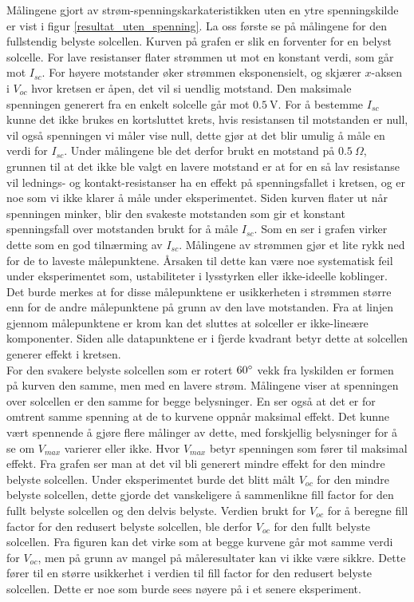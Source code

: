 \documentclass[%
 reprint,
 amsmath,amssymb,
 aps,
 norsk,
 booktabs
]{revtex4-1}
\begin{document}
Målingene gjort av strøm-spenningskarkateristikken uten en ytre spenningskilde er vist i figur \vref{resultat_uten_spenning}. La oss første se på målingene for den fullstendig belyste solcellen. Kurven på grafen er slik en forventer for en belyst solcelle. For lave resistanser flater strømmen ut mot en konstant verdi, som går mot $I_{sc}$. For høyere motstander øker strømmen eksponensielt, og skjærer $x$-aksen i $V_{oc}$ hvor kretsen er åpen, det vil si uendlig motstand. Den maksimale spenningen generert fra en enkelt solcelle går mot $\SI{0.5}{\volt}$. For å bestemme $I_{sc}$ kunne det ikke brukes en kortsluttet krets, hvis resistansen til motstanden er null, vil også spenningen vi måler vise null, dette gjør at det blir umulig å måle en verdi for $I_{sc}$. Under målingene ble det derfor brukt en motstand på $\SI{0.5}{\Omega}$, grunnen til at det ikke ble valgt en lavere motstand er at for en så lav resistanse vil lednings- og kontakt-resistanser ha en effekt på spenningsfallet i kretsen, og er noe som vi ikke klarer å måle under eksperimentet. Siden kurven flater ut når spenningen minker, blir den svakeste motstanden som gir et konstant spenningsfall over motstanden brukt for å måle $I_{sc}$. Som en ser i grafen virker dette som en god tilnærming av $I_{sc}$. Målingene av strømmen gjør et lite rykk ned for de to laveste målepunktene. Årsaken til dette kan være noe systematisk feil under eksperimentet som, ustabiliteter i lysstyrken eller ikke-ideelle koblinger. Det burde merkes at for disse målepunktene er usikkerheten i strømmen større enn for de andre målepunktene på grunn av den lave motstanden. Fra at linjen gjennom målepunktene er krom kan det sluttes at solceller er ikke-lineære komponenter. Siden alle datapunktene er i fjerde kvadrant betyr dette at solcellen generer effekt i kretsen. \\
For den svakere belyste solcellen som er rotert $60\degree$ vekk fra lyskilden er formen på kurven den samme, men med en lavere strøm. Målingene viser at spenningen over solcellen er den samme for begge belysninger. En ser også at det er for omtrent samme spenning at de to kurvene oppnår maksimal effekt. Det kunne vært spennende å gjøre flere målinger av dette, med forskjellig belysninger for å se om $V_{max}$ varierer eller ikke. Hvor $V_{max}$ betyr spenningen som fører til maksimal effekt. Fra grafen ser man at det vil bli generert mindre effekt for den mindre belyste solcellen. Under eksperimentet burde det blitt målt $V_{oc}$ for den mindre belyste solcellen, dette gjorde det vanskeligere å sammenlikne fill factor for den fullt belyste solcellen og den delvis belyste. Verdien brukt for $V_{oc}$ for å beregne fill factor for den redusert belyste solcellen, ble derfor $V_{oc}$ for den fullt belyste solcellen. Fra figuren kan det virke som at begge kurvene går mot samme verdi for $V_{oc}$, men på grunn av mangel på måleresultater kan vi ikke være sikkre. Dette fører til en større usikkerhet i verdien til fill factor for den redusert belyste solcellen. Dette er noe som burde sees nøyere på i et senere eksperiment.\par
\end{document}
